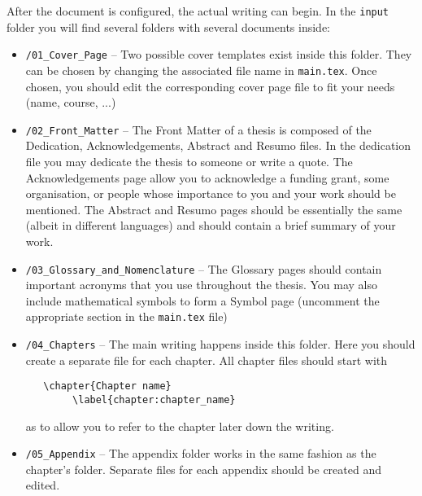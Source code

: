 After the document is configured, the actual writing can begin. In the \texttt{input} folder you will find several folders with several documents inside:

\begin{itemize}
	\item \texttt{/01\_Cover\_Page} -- Two possible cover templates exist inside this folder. They can be chosen by changing the associated file name in \texttt{main.tex}. Once chosen, you should edit the corresponding cover page file to fit your needs (name, course, ...)
	
	\item \texttt{/02\_Front\_Matter} -- The Front Matter of a thesis is composed of the Dedication, Acknowledgements, Abstract and Resumo files. In the dedication file you may dedicate the thesis to someone or write a quote. The Acknowledgements page allow you to acknowledge a funding grant, some organisation, or people whose importance to you and your work should be mentioned. The Abstract and Resumo pages should be essentially the same (albeit in different languages) and should contain a brief summary of your work.
	
	\item \texttt{/03\_Glossary\_and\_Nomenclature} -- The Glossary pages should contain important acronyms that you use throughout the thesis. You may also include mathematical symbols to form a Symbol page (uncomment the appropriate section in the \texttt{main.tex} file)
	 
	 \item \texttt{/04\_Chapters} -- The main writing happens inside this folder. Here you should create a separate file for each chapter. All chapter files should start with
	 \subitem %
	 \vspace{-1cm}
	 \begin{verbatim} 	\chapter{Chapter name}
	 	\label{chapter:chapter_name}
	 \end{verbatim}
 	 \vspace{-0.8cm}
	as to allow you to refer to the chapter later down the writing.
		
	\item \texttt{/05\_Appendix} -- The appendix folder works in the same fashion as the chapter's folder. Separate files for each appendix should be created and edited.
\end{itemize}

